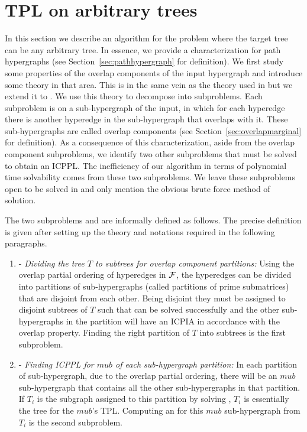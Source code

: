 \section{ TPL on arbitrary trees}
\label{sec:norestraint}

In this section we describe an algorithm for the \CFTPL problem where
the target tree can be any arbitrary tree. In essence, we provide a
characterization for path hypergraphs (see
Section~\ref{sec:pathhypergraph} for definition).  We first study some
properties of the overlap components of the input hypergraph and
introduce some theory in that area. This is in the same vein as the
theory used in \cite{wlh02,nsnrs09} but we extend it to \TPL.  We use
this theory to decompose \CFTPL into subproblems.  Each subproblem is
on a sub-hypergraph of the input, in which for each hyperedge there is
another hyperedge in the sub-hypergraph that overlaps with it. These
sub-hypergraphs are called overlap components (see
Section~\ref{sec:overlapmarginal} for definition). As a consequence of
this characterization, aside from the overlap component subproblems,
we identify two other subproblems that must be solved to obtain an
ICPPL.  The inefficiency of our algorithm in terms of polynomial time
solvability comes from these two subproblems. We leave these subproblems
open to be solved in \p and only mention the obvious brute force
method of solution.

The two subproblems \FOCPS and \FMFT are informally defined as
follows. The precise definition is given after setting up the theory
and notations required in the following paragraphs.
\begin{enumerate}
\item \FOCPS - {\em Dividing the tree $T$ to subtrees for overlap
    component partitions: } Using the overlap partial ordering of
  hyperedges in ${\cal F}$, the hyperedges can be divided into partitions
  of sub-hypergraphs (called partitions of prime submatrices) that are
  disjoint from each other. Being disjoint they must be assigned to
  disjoint subtrees of $T$ such that \FMFT can be solved successfully
  and the other sub-hypergraphs in the partition will have an ICPIA
  in accordance with the overlap property. Finding the right partition
  of $T$ into subtrees is the first subproblem.

\item \FMFT - {\em Finding ICPPL for $mub$ of each sub-hypergraph
    partition: } In each partition of sub-hypergraph, due to the
  overlap partial ordering, there will be an $mub$ sub-hypergraph that
  contains all the other sub-hypergraphs in that partition. If $T_i$
  is the subgraph assigned to this partition by solving \FOCPS, $T_i$
  is essentially the tree for the $mub$'s TPL. Computing an \ICPPL for
  this $mub$ sub-hypergraph from $T_i$ is the second subproblem.
\end{enumerate}


